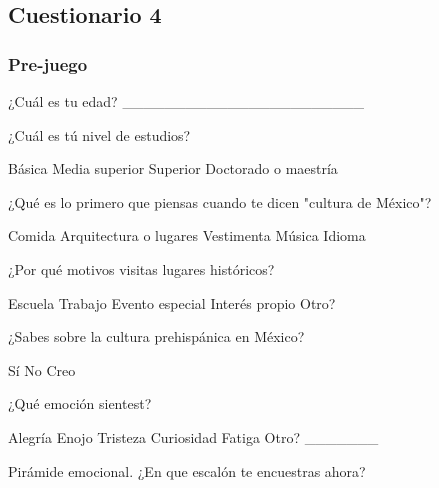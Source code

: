 \subsection{Cuestionario 4}

\subsubsection{Pre-juego}
\begin{questions}
	
	\question ¿Cuál es tu edad?
	_______________________
	
	\question ¿Cuál es tú nivel de estudios?
	\begin{checkboxes}
		\choice Básica
		\choice Media superior
		\choice Superior
		\choice Doctorado o maestría
	\end{checkboxes}
	
	\question ¿Qué es lo primero que piensas cuando te dicen "cultura de México"?
	\begin{checkboxes}
		\choice Comida
		\choice Arquitectura o lugares
		\choice Vestimenta
		\choice Música
		\choice Idioma	
	\end{checkboxes}
	
	\question ¿Por qué motivos visitas lugares históricos?
	\begin{checkboxes}
		\choice Escuela
		\choice Trabajo
		\choice Evento especial
		\choice Interés propio
		\choice Otro?
	\end{checkboxes}
	
	\question ¿Sabes sobre la cultura prehispánica en México?
	\begin{checkboxes}
		\choice Sí
		\choice No
		\choice Creo
	\end{checkboxes}
	
	\question ¿Qué emoción sientest? 
	\begin{checkboxes}
		\choice Alegría
		\choice Enojo
		\choice Tristeza
		\choice Curiosidad
		\choice Fatiga
		\choice Otro? _______
	\end{checkboxes}
	
	\question Pirámide emocional. ¿En que escalón te encuestras ahora?
	
	
	
\end{questions}

